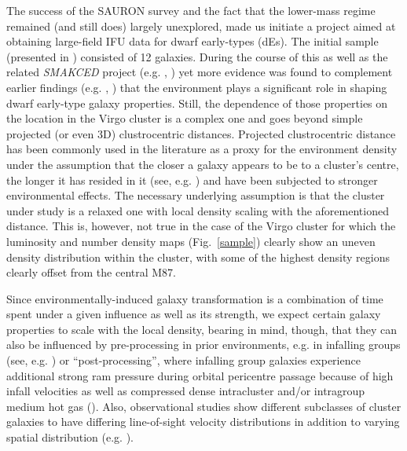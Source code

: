 \documentclass[useAMS,usenatbib]{mn2e}
\begin{document}
The success of the SAURON survey and the fact that the lower-mass regime remained (and still does) largely unexplored, made us initiate a project aimed at obtaining large-field IFU data for dwarf early-types (dEs). The initial sample (presented in \citealt{rys:2013}) consisted of 12 galaxies. During the course of this as well as the related  \textit{SMAKCED} project (e.g. \citealt{janz:2014}, \citealt{toloba:2014}) yet more evidence was found to complement earlier findings (e.g. \citealt{lisker:2006a}, \citealt{toloba:2009}) that the environment plays a significant role in shaping dwarf early-type galaxy properties. Still, the dependence of those properties on the location in the Virgo cluster is a complex one and goes beyond simple projected (or even 3D) clustrocentric distances. Projected clustrocentric distance has been commonly used in the literature as a proxy for the environment density under the assumption that the closer a galaxy appears to be to a cluster's centre, the longer it has resided in it (see, e.g. \citealt{lisker:2013}) and have been subjected to stronger environmental effects. The necessary underlying assumption is that the cluster under study is a relaxed one with local density scaling with the aforementioned distance. This is, however, not true in the case of the Virgo cluster for which the luminosity and number density maps (Fig.~\ref{sample}) clearly show an uneven density distribution within the cluster, with some of the highest density regions clearly offset from the central M87.

Since environmentally-induced galaxy transformation is a combination of time spent under a given influence as well as its strength, we expect certain galaxy properties to scale with the local density, bearing in mind, though, that they can also be influenced by pre-processing in prior environments, e.g. in infalling groups (see, e.g. \citealt{conselice:2001}) or ``post-processing'', where infalling group galaxies experience additional strong ram pressure during orbital pericentre passage because of high infall velocities as well as compressed dense intracluster and/or intragroup medium hot gas (\citealt{vijayaraghavan:2013}). Also, observational studies show different subclasses of cluster galaxies to have differing line-of-sight velocity distributions in addition to varying spatial distribution (e.g. \citealt{derijcke:2010}).
\end{document}
